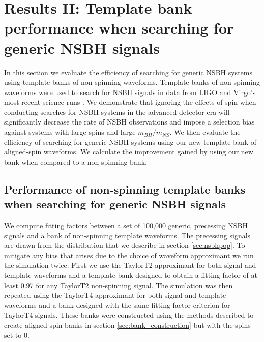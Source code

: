 \section{Results II: Template bank performance when searching for generic NSBH 
signals}
\label{sec:resultsII_generic}

In this section we evaluate the efficiency of searching for generic
\ac{NSBH} systems using template banks of non-spinning waveforms. Template 
banks of non-spinning waveforms were used to search for \ac{NSBH} 
signals in data from LIGO and Virgo's most recent science runs 
\cite{Abbott:2009tt,Abbott:2009qj,Abadie:2010yba,Abadie:2011nz}.
We demonstrate that ignoring the effects of spin when conducting searches
for \ac{NSBH} systems in the advanced detector era will significantly decrease
the rate of \ac{NSBH} observations and impose a selection bias against systems
with large spins and large $m_{BH} / m_{NS}$. We then evaluate the efficiency 
of 
searching for generic \ac{NSBH} systems using our new template bank of 
aligned-spin waveforms. We calculate the improvement gained by using our new 
bank when compared to a non-spinning bank.

\subsection{Performance of non-spinning template banks when searching for 
generic
NSBH signals}
\label{sec:non_spinning}

We compute fitting factors between a set of 100,000 generic, precessing
\ac{NSBH} signals and a bank of non-spinning template waveforms. The
precessing signals are drawn from the distribution
that we describe in section \ref{sec:nsbhpop}.
To mitigate any bias that arises due to the choice of waveform approximant
we run the simulation twice. First we use the TaylorT2 approximant for both
signal and template waveforms and a template bank designed to obtain
a fitting factor of at least 0.97 for any TaylorT2 non-spinning signal.
The simulation was then repeated using the TaylorT4 approximant for both signal
and template waveforms and a bank designed with the same fitting factor
criterion for TaylorT4 signals. These banks were constructed using the methods
described to create aligned-spin banks in section \ref{sec:bank_construction}
but with the spins set to 0.

